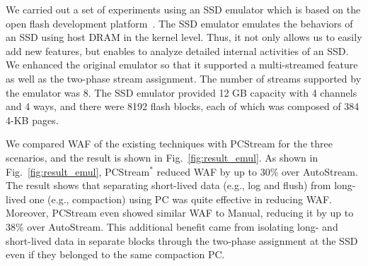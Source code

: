 We carried out a set of experiments using an SSD emulator which is based on the
open flash development platform~\cite{AMF}.  The SSD emulator emulates the
behaviors of an SSD using host DRAM in the kernel level. Thus, it not only
allows us to easily add new features, but enables to analyze detailed internal
activities of an SSD.  We enhanced the original emulator so that it supported a
multi-streamed feature as well as the two-phase stream assignment.  The number
of streams supported by the emulator was 8.  The SSD emulator provided 12 GB
capacity with 4 channels and 4 ways, and there were 8192 flash blocks, each of
which was composed of 384 4-KB pages.  

We compared WAF of the existing techniques with {\sf PCStream} for the three
scenarios, and the result is shown in Fig.~\ref{fig:result_emul}.  As shown in
Fig.~\ref{fig:result_emul}, {\sf PCStream$^*$} reduced WAF by up to 30\% over
\textsf{AutoStream}.  The result shows that separating short-lived data (e.g.,
log and flush) from long-lived one (e.g., compaction) using PC was quite
effective in reducing WAF.  Moreover, {\sf PCStream} even showed similar WAF to
\textsf{Manual}, reducing it by up to 38\% over \textsf{AutoStream}.  This
additional benefit came from isolating long- and short-lived data in separate
blocks through the two-phase assignment at the SSD even if they belonged to the
same compaction PC.


